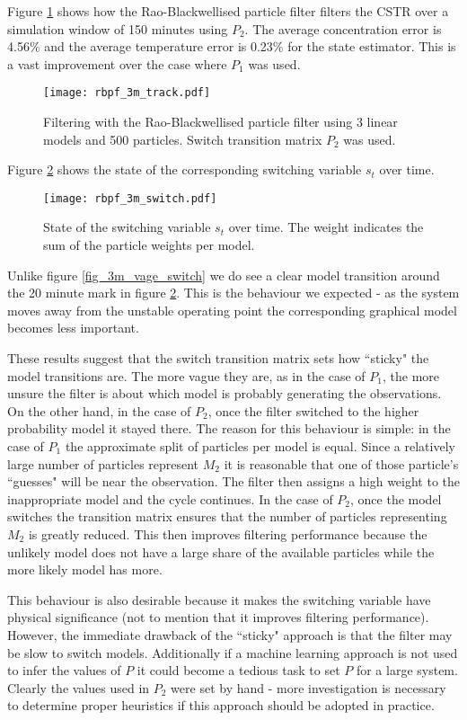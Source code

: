 Figure \ref{fig_3m_track} shows how the Rao-Blackwellised particle filter filters the CSTR over a simulation window of 150 minutes using $P_2$. The average concentration error is 4.56\% and the average temperature error is 0.23\% for the state estimator. This is a vast improvement over the case where $P_1$ was used.
\begin{figure}[H] 
\centering
\texttt{[image: rbpf\_3m\_track.pdf]}
\caption{Filtering with the Rao-Blackwellised particle filter using 3 linear models and 500 particles. Switch transition matrix $P_2$ was used.}
\label{fig_3m_track}
\end{figure}
Figure \ref{fig_3m_switch} shows the state of the corresponding switching variable $s_t$ over time.
\begin{figure}[H] 
\centering
\texttt{[image: rbpf\_3m\_switch.pdf]}
\caption{State of the switching variable $s_t$ over time. The weight indicates the sum of the particle weights per model.}
\label{fig_3m_switch}
\end{figure}
Unlike figure \ref{fig_3m_vage_switch} we do see a clear model transition around the 20 minute mark in figure \ref{fig_3m_switch}. This is the behaviour we expected - as the system moves away from the unstable operating point the corresponding graphical model becomes less important.

These results suggest that the switch transition matrix sets how ``sticky" the model transitions are. The more vague they are, as in the case of $P_1$, the more unsure the filter is about which model is probably generating the observations. On the other hand, in the case of $P_2$, once the filter switched to the higher probability model it stayed there. The reason for this behaviour is simple: in the case of $P_1$ the approximate split of particles per model is equal. Since a relatively large number of particles represent $M_2$ it is reasonable that one of those particle's ``guesses" will be near the observation. The filter then assigns a high weight to the inappropriate model and the cycle continues. In the case of $P_2$, once the model switches the transition matrix ensures that the number of particles representing $M_2$ is greatly reduced. This then improves filtering performance because the unlikely model does not have a large share of the available particles while the more likely model has more.

This behaviour is also desirable because it makes the switching variable have physical significance (not to mention that it improves filtering performance). However, the immediate drawback of the ``sticky" approach is that the filter may be slow to switch models. Additionally if a machine learning approach is not used to infer the values of $P$ it could become a tedious task to set $P$ for a large system. Clearly the values used in $P_2$ were set by hand - more investigation is necessary to determine proper heuristics if this approach should be adopted in practice.

